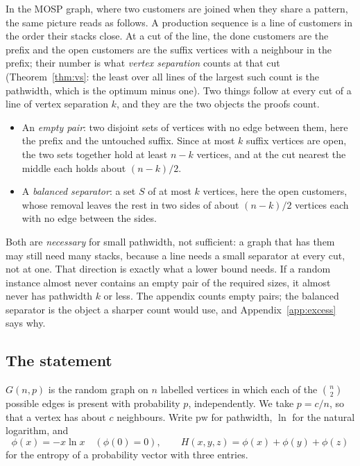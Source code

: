 In the MOSP graph, where two customers are joined when they share a pattern,
the same picture reads as follows. A production sequence is a line of
customers in the order their stacks close. At a cut of the line, the done
customers are the prefix and the open customers are the suffix vertices with a
neighbour in the prefix; their number is what \emph{vertex separation} counts
at that cut (Theorem~\ref{thm:vs}: the least over all lines of the largest
such count is the pathwidth, which is the optimum minus one). Two things
follow at every cut of a line of vertex separation $k$, and they are the two
objects the proofs count.

\begin{itemize}
\item An \emph{empty pair}: two disjoint sets of vertices with no edge between
  them, here the prefix and the untouched suffix. Since at most $k$ suffix
  vertices are open, the two sets together hold at least $n-k$ vertices, and
  at the cut nearest the middle each holds about $(n-k)/2$.
\item A \emph{balanced separator}: a set $S$ of at most $k$ vertices, here the
  open customers, whose removal leaves the rest in two sides of about
  $(n-k)/2$ vertices each with no edge between the sides.
\end{itemize}

Both are \emph{necessary} for small pathwidth, not sufficient: a graph that
has them may still need many stacks, because a line needs a small separator
at every cut, not at one. That direction is exactly what a lower bound needs.
If a random instance almost never contains an empty pair of the required
sizes, it almost never has pathwidth $k$ or less. The appendix counts empty
pairs; the balanced separator is the object a sharper count would use, and
Appendix~\ref{app:excess} says why.

\subsection{The statement}

$G(n,p)$ is the random graph on $n$ labelled vertices in which each of the
$\binom n2$ possible edges is present with probability $p$, independently. We
take $p=c/n$, so that a vertex has about $c$ neighbours. Write
$\mathrm{pw}$ for pathwidth, $\ln$ for the natural logarithm, and
\[
  \phi(x) = -x\ln x \quad(\phi(0)=0),\qquad
  H(x,y,z) = \phi(x)+\phi(y)+\phi(z)
\]
for the entropy of a probability vector with three entries.

